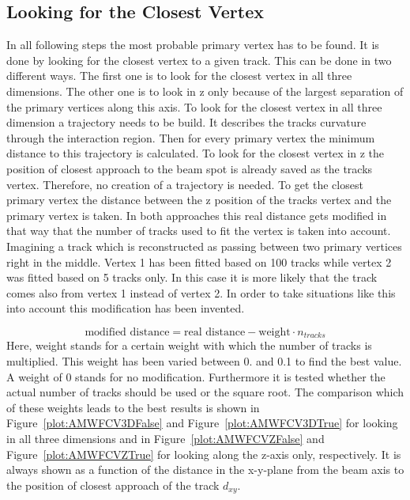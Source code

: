 \subsection{Looking for the Closest Vertex\label{sec:AMWFCV}}

In all following steps the most probable primary vertex has to be found. It is done by looking for the closest vertex to a given track. This can be done in two different ways. The first one is to look for the closest vertex in all three dimensions. The other one is to look in z only because of the largest separation of the primary vertices along this axis. To look for the closest vertex in all three dimension a trajectory needs to be build. It describes the tracks curvature through the interaction region. Then for every primary vertex the minimum distance to this trajectory is calculated. To look for the closest vertex in z the position of closest approach to the beam spot is already saved as the tracks vertex. Therefore, no creation of a trajectory is needed. To get the closest primary vertex the distance between the z position of the tracks vertex and the primary vertex is taken. In both approaches this real distance gets modified in that way that the number of tracks used to fit the vertex is taken into account. Imagining a track which is reconstructed as passing between two primary vertices right in the middle. Vertex 1 has been fitted based on 100 tracks while vertex 2 was fitted based on 5 tracks only. In this case it is more likely that the track comes also from vertex 1 instead of vertex 2. In order to take situations like this into account this modification has been invented. 

\begin{displaymath}
\textrm{modified distance} = \textrm{real distance} - \textrm{weight} \cdot n_{tracks}
\end{displaymath}
Here, weight stands for a certain weight with which the number of tracks is multiplied. This weight has been varied between 0. and 0.1 to find the best value. A weight of 0 stands for no modification. Furthermore it is tested whether the actual number of tracks should be used or the square root. The comparison which of these weights leads to the best results is shown in Figure~\ref{plot:AMWFCV3DFalse} and Figure~\ref{plot:AMWFCV3DTrue} for looking in all three dimensions and in Figure~\ref{plot:AMWFCVZFalse} and Figure~\ref{plot:AMWFCVZTrue} for looking along the z-axis only, respectively. It is always shown as a function of the distance in the x-y-plane from the beam axis to the position of closest approach of the track $d_{xy}$.

